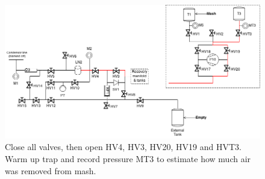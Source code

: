 \documentclass[a4paper,10pt]{article}
\begin{document}
\begin{figure}[htbp!]
 \centering
 \includegraphics[width=\textwidth]{./mash-cleaning-schematic-7-measure-trapped-gas}
 \caption{Close all valves, then open HV4, HV3, HV20, HV19 and HVT3.  Warm up trap and record pressure MT3 to estimate how much air was removed from mash.}
 \label{g}
\end{figure}
\end{document}
